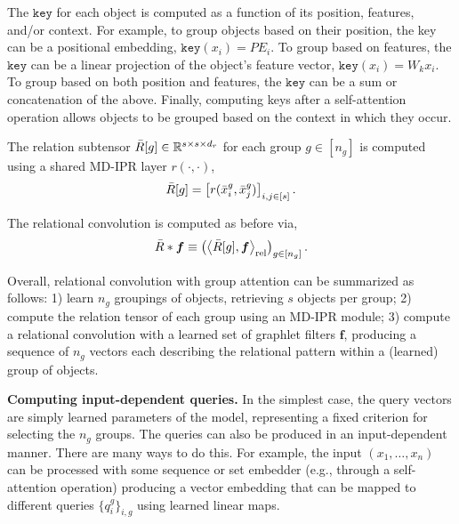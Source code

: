 The $\mathtt{key}$ for each object is computed as a function of its position, features, and/or context. For example, to group objects based on their position, the key can be a positional embedding, $\mathtt{key}(x_i) = PE_i$. To group based on features, the $\mathtt{key}$ can be a linear projection of the object's feature vector, $\mathtt{key}(x_i) = W_k x_i$. To group based on both position and features, the $\mathtt{key}$ can be a sum or concatenation of the above. Finally, computing keys after a self-attention operation allows objects to be grouped based on the context in which they occur.

The relation subtensor $\bar{R}[g] \in \mathbb{R}^{s \times s \times d_r}$ for each group $g \in [n_g]$ is computed using a shared MD-IPR layer $r(\cdot, \cdot)$,
\begin{equation}\label{eq:group_attn_relsubtensor}
    \bar{R}[g] = \left[r(\bar{x}_{i}^{g}, \bar{x}_{j}^{g})\right]_{i,j \in [s]}.
\end{equation}

The relational convolution is computed as before via,
\begin{equation}\label{eq:relconv_groupattn}
    \bar{R} \ast \bm{f} \equiv \left(\left\langle \bar{R}[g], \bm{f} \right\rangle_\mathrm{rel}\right)_{g \in [n_g]}.
\end{equation}

Overall, relational convolution with group attention can be summarized as follows: 1) learn $n_g$ groupings of objects, retrieving $s$ objects per group; 2) compute the relation tensor of each group using an MD-IPR module; 3) compute a relational convolution with a learned set of graphlet filters $\bm{f}$, producing a sequence of $n_g$ vectors each describing the relational pattern within a (learned) group of objects.

\textbf{Computing input-dependent queries.} In the simplest case, the query vectors are simply learned parameters of the model, representing a fixed criterion for selecting the $n_g$ groups. The queries can also be produced in an input-dependent manner. There are many ways to do this. For example, the input $(x_1, \ldots, x_n)$ can be processed with some sequence or set embedder (e.g., through a self-attention operation) producing a vector embedding that can be mapped to different queries $\{q_{i}^g\}_{i,g}$ using learned linear maps.

